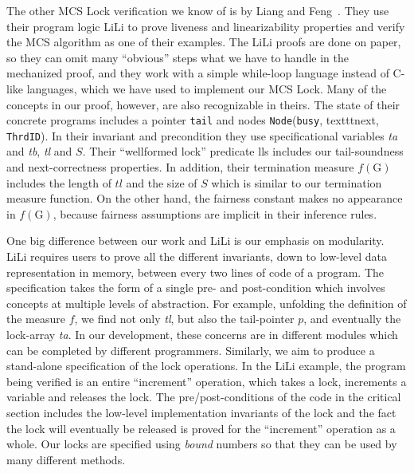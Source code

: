 The other MCS Lock verification we know of is by Liang and
Feng~\cite{lili16}. 
They use their program logic LiLi to prove
liveness and linearizability properties and verify the MCS algorithm
as one of their examples.  
The LiLi proofs are done on paper, so they
can omit many ``obvious'' steps what we have to handle in the mechanized proof, 
and they work with a simple
while-loop language instead of C-like languages, which we have used to implement our MCS Lock.
Many of the concepts in our proof, however, 
are also recognizable in theirs. 
The state of their concrete
  programs includes a pointer \texttt{tail} and nodes
 \texttt{Node}(\texttt{busy}, texttt{next}, \texttt{ThrdID}).
In their invariant and precondition they use specificational variables
\textit{ta} and \textit{tb}, \textit{tl} and $S$. Their
  ``wellformed lock'' predicate \textsf{lls} includes our
  tail-soundness and next-correctness properties.
In addition, their
termination measure $f(\mathrm{G})$ includes the length of
$\mathit{tl}$ and the size of $S$ which is similar to our termination measure function. 
On the other hand, the fairness
constant makes no appearance in $f(\mathrm{G})$, because fairness
assumptions are implicit in their inference rules.

One big difference between our work and LiLi is our emphasis on
modularity.  
LiLi requires users to prove all the different invariants, down to low-level data representation in memory, between every two lines of code of a program.
The specification takes the form of a single
pre- and post-condition which involves concepts at multiple levels of
abstraction. For example, unfolding the definition of the measure $f$,
we find not only \textit{tl}, but also the tail-pointer $p$, and
eventually the lock-array  \textit{ta}. In our development, these
concerns are in different modules which can be completed by different
programmers.  Similarly, we aim to produce a stand-alone specification
of the lock operations. In the LiLi example, the program being
verified is an entire ``increment'' operation, which takes a lock,
increments a variable and releases the lock. The pre/post-conditions
of the code in the critical section includes the low-level
implementation invariants of the lock and the fact the lock will
eventually be released is proved for the ``increment'' operation as a
whole. Our locks are specified using \emph{bound} numbers so that they can be used by many different methods.


